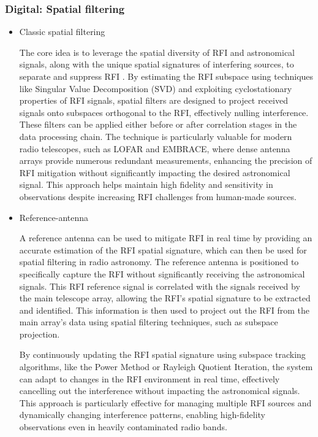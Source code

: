 \subsubsection{Digital: Spatial filtering}
\begin{itemize}
\item Classic spatial filtering

The core idea is to leverage the spatial diversity of RFI and astronomical signals, along with the unique spatial signatures of interfering sources, to separate and suppress RFI \citep{hellbourg2014radio,hellbourg2016spatial,hellbourg2014rfi}. By estimating the RFI subspace using techniques like Singular Value Decomposition (SVD) and exploiting cyclostationary properties of RFI signals, spatial filters are designed to project received signals onto subspaces orthogonal to the RFI, effectively nulling interference. These filters can be applied either before or after correlation stages in the data processing chain. The technique is particularly valuable for modern radio telescopes, such as LOFAR and EMBRACE, where dense antenna arrays provide numerous redundant measurements, enhancing the precision of RFI mitigation without significantly impacting the desired astronomical signal. This approach helps maintain high fidelity and sensitivity in observations despite increasing RFI challenges from human-made sources.

\item Reference-antenna

A reference antenna can be used to mitigate RFI in real time by providing an accurate estimation of the RFI spatial signature, which can then be used for spatial filtering in radio astronomy. The reference antenna is positioned to specifically capture the RFI without significantly receiving the astronomical signals. This RFI reference signal is correlated with the signals received by the main telescope array, allowing the RFI's spatial signature to be extracted and identified. This information is then used to project out the RFI from the main array's data using spatial filtering techniques, such as subspace projection.

By continuously updating the RFI spatial signature using subspace tracking algorithms, like the Power Method or Rayleigh Quotient Iteration, the system can adapt to changes in the RFI environment in real time, effectively cancelling out the interference without impacting the astronomical signals. This approach is particularly effective for managing multiple RFI sources and dynamically changing interference patterns, enabling high-fidelity observations even in heavily contaminated radio bands\citep{hellbourg2014reference,sardarabadi2015spatial}.

\end{itemize}
